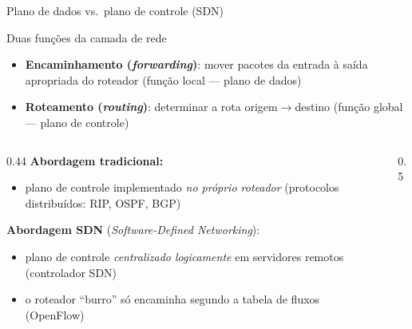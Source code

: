 \documentclass[aspectratio=169,11pt]{beamer}
\begin{document}
\begin{frame}{Plano de dados vs.\ plano de controle (SDN)}
  \begin{block}{Duas funções da camada de rede}
    \begin{itemize}
      \item \textbf{Encaminhamento (\emph{forwarding})}: mover pacotes da entrada à saída apropriada do roteador \quad (função local --- \alert{plano de dados})
      \item \textbf{Roteamento (\emph{routing})}: determinar a rota origem$\rightarrow$destino \quad (função global --- \alert{plano de controle})
    \end{itemize}
  \end{block}
  \begin{columns}
    \begin{column}{0.44\textwidth}
      \textbf{Abordagem tradicional:}
      \begin{itemize}
        \item plano de controle implementado \emph{no próprio roteador} (protocolos distribuídos: RIP, OSPF, BGP)
      \end{itemize}
      \textbf{Abordagem SDN} (\emph{Software-Defined Networking}):
      \begin{itemize}
        \item plano de controle \emph{centralizado logicamente} em servidores remotos (controlador SDN)
        \item o roteador ``burro'' só encaminha segundo a tabela de fluxos (OpenFlow)
      \end{itemize}
    \end{column}
    \begin{column}{0.5\textwidth}
      \begin{center}
      \end{center}
    \end{column}
  \end{columns}
\end{frame}
\end{document}
